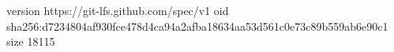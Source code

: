 version https://git-lfs.github.com/spec/v1
oid sha256:d7234804af930fce478d4ca94a2afba18634aa53d561c0e73c89b559ab6e90c1
size 18115
